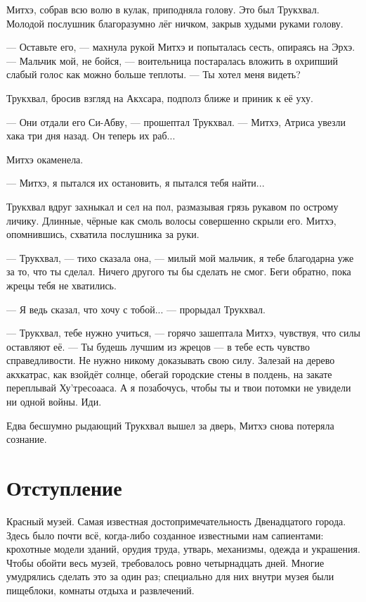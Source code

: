 Митхэ, собрав всю волю в кулак, приподняла голову.
Это был Трукхвал.
Молодой послушник благоразумно лёг ничком, закрыв худыми руками голову.

--- Оставьте его, --- махнула рукой Митхэ и попыталась сесть, опираясь на Эрхэ.
--- Мальчик мой, не бойся, --- воительница постаралась вложить в охрипший слабый голос как можно больше теплоты.
--- Ты хотел меня видеть?

Трукхвал, бросив взгляд на Акхсара, подполз ближе и приник к её уху.

--- Они отдали его Си-Абву, --- прошептал Трукхвал.
--- Митхэ, Атриса увезли хака три дня назад.
Он теперь их раб...

Митхэ окаменела.

--- Митхэ, я пытался их остановить, я пытался тебя найти...

Трукхвал вдруг захныкал и сел на пол, размазывая грязь рукавом по острому личику.
Длинные, чёрные как смоль волосы совершенно скрыли его.
Митхэ, опомнившись, схватила послушника за руки.

--- Трукхвал, --- тихо сказала она, --- милый мой мальчик, я тебе благодарна уже за то, что ты сделал.
Ничего другого ты бы сделать не смог.
Беги обратно, пока жрецы тебя не хватились.

--- Я ведь сказал, что хочу с тобой... --- прорыдал Трукхвал.

--- Трукхвал, тебе нужно учиться, --- горячо зашептала Митхэ, чувствуя, что силы оставляют её.
--- Ты будешь лучшим из жрецов --- в тебе есть чувство справедливости.
Не нужно никому доказывать свою силу.
Залезай на дерево акхкатрас, как взойдёт солнце, обегай городские стены в полдень, на закате переплывай Ху'тресоааса.
А я позабочусь, чтобы ты и твои потомки не увидели ни одной войны.
Иди.

Едва бесшумно рыдающий Трукхвал вышел за дверь, Митхэ снова потеряла сознание.

\section{Отступление}

Красный музей.
Самая известная достопримечательность Двенадцатого города.
Здесь было почти всё, когда-либо созданное известными нам сапиентами: крохотные модели зданий, орудия труда, утварь, механизмы, одежда и украшения.
Чтобы обойти весь музей, требовалось ровно четырнадцать дней.
Многие умудрялись сделать это за один раз;
специально для них внутри музея были пищеблоки, комнаты отдыха и развлечений.

